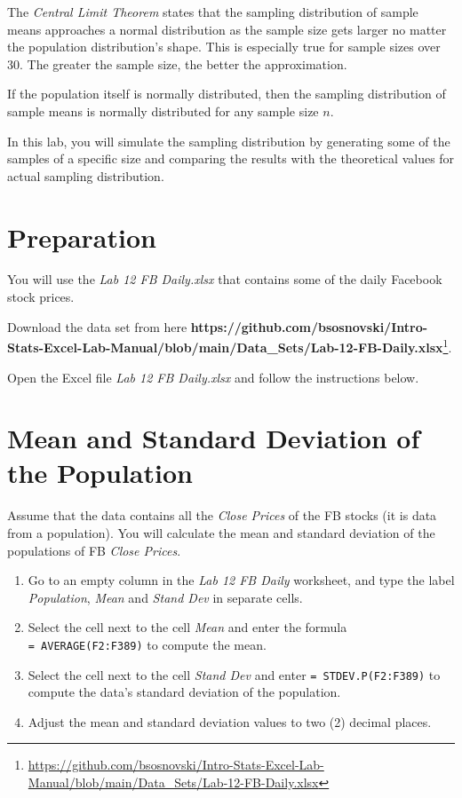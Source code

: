 \documentclass[
  12pt,
  letterpaper,
]{book}
\providecommand{\tightlist}{%
  \setlength{\itemsep}{0pt}\setlength{\parskip}{0pt}}
\DeclareRobustCommand{\href}[2]{#2\footnote{\url{#1}}}
\begin{document}
The \emph{Central Limit Theorem} states that the sampling distribution of sample means approaches a normal distribution as the sample size gets larger no matter the population distribution's shape. This is especially true for sample sizes over 30. The greater the sample size, the better the approximation.

If the population itself is normally distributed, then the sampling distribution of sample means is normally distributed for any sample size \(n\).

In this lab, you will simulate the sampling distribution by generating some of the samples of a specific size and comparing the results with the theoretical values for actual sampling distribution.

\hypertarget{preparation-8}{%
\section{Preparation}\label{preparation-8}}

You will use the \emph{Lab 12 FB Daily.xlsx} that contains some of the daily Facebook stock prices.

Download the data set from here \href{https://github.com/bsosnovski/Intro-Stats-Excel-Lab-Manual/blob/main/Data_Sets/Lab-12-FB-Daily.xlsx}{\textbf{https://github.com/bsosnovski/Intro-Stats-Excel-Lab-Manual/blob/main/Data\_Sets/Lab-12-FB-Daily.xlsx}}.

Open the Excel file \emph{Lab 12 FB Daily.xlsx} and follow the instructions below.

\hypertarget{mean-stdev-population}{%
\section{Mean and Standard Deviation of the Population}\label{mean-stdev-population}}

Assume that the data contains all the \emph{Close Prices} of the FB stocks (it is data from a population). You will calculate the mean and standard deviation of the populations of FB \emph{Close Prices}.

\begin{enumerate}
\def\labelenumi{\arabic{enumi}.}
\tightlist
\item
  Go to an empty column in the \emph{Lab 12 FB Daily} worksheet, and type the label \emph{Population}, \emph{Mean} and \emph{Stand Dev} in separate cells.
\item
  Select the cell next to the cell \emph{Mean} and enter the formula \texttt{=\ AVERAGE(F2:F389)} to compute the mean.
\item
  Select the cell next to the cell \emph{Stand Dev} and enter \texttt{=\ STDEV.P(F2:F389)} to compute the data's standard deviation of the population.
\item
  Adjust the mean and standard deviation values to two (2) decimal places.
\end{enumerate}
\end{document}
